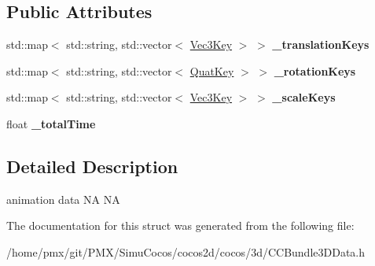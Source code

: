 \subsection*{Public Attributes}
\begin{DoxyCompactItemize}
\item 
\mbox{\label{structAnimation3DData_a4100bc9cd04fce9ae5fe6b7f6ed950b9}} 
std\+::map$<$ std\+::string, std\+::vector$<$ \hyperlink{structAnimation3DData_1_1Vec3Key}{Vec3\+Key} $>$ $>$ {\bfseries \+\_\+translation\+Keys}
\item 
\mbox{\label{structAnimation3DData_a4f6ffab37d8d61da35155bd0f0cc6a0d}} 
std\+::map$<$ std\+::string, std\+::vector$<$ \hyperlink{structAnimation3DData_1_1QuatKey}{Quat\+Key} $>$ $>$ {\bfseries \+\_\+rotation\+Keys}
\item 
\mbox{\label{structAnimation3DData_a6211619fe9db64039a1c1f4111b60fc1}} 
std\+::map$<$ std\+::string, std\+::vector$<$ \hyperlink{structAnimation3DData_1_1Vec3Key}{Vec3\+Key} $>$ $>$ {\bfseries \+\_\+scale\+Keys}
\item 
\mbox{\label{structAnimation3DData_a04dc0ae2610487e79a17ae79f02120f1}} 
float {\bfseries \+\_\+total\+Time}
\end{DoxyCompactItemize}


\subsection{Detailed Description}
animation data  NA  NA 

The documentation for this struct was generated from the following file\+:\begin{DoxyCompactItemize}
\item 
/home/pmx/git/\+P\+M\+X/\+Simu\+Cocos/cocos2d/cocos/3d/C\+C\+Bundle3\+D\+Data.\+h\end{DoxyCompactItemize}
